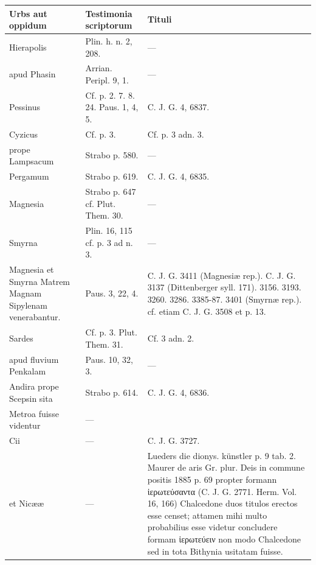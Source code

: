 \documentclass[a4paper, 11pt, oneside, polutonikogreek, german, twocolumn]{article}
\begin{document}
\begin{table}[H]
    \centering
    \begin{tabular}{|p{40mm}|p{45mm}|p{75mm}|}
    \hline
        \textbf{Urbs aut oppidum} & \textbf{Testimonia scriptorum} & \textbf{Tituli} \\ \hline
        Hierapolis & Plin. h. n. 2, 208. & --- \\ \hline
        apud Phasin & Arrian. Peripl. 9, 1. & --- \\ \hline
        Pessinus & Cf. p. 2. 7. 8. 24. Paus. 1, 4, 5. & C. J. G. 4, 6837. \\ \hline
        Cyzicus & Cf. p. 3. & Cf. p. 3 adn. 3. \\ \hline
        prope Lampsacum & Strabo p. 580. & --- \\ \hline
        Pergamum & Strabo p. 619. & C. J. G. 4, 6835. \\ \hline
        Magnesia & Strabo p. 647 cf. Plut. Them. 30. & --- \\ \hline
        Smyrna & Plin. 16, 115 cf. p. 3 ad n. 3. & --- \\ \hline
        Magnesia et Smyrna Matrem Magnam Sipylenam venerabantur. & Paus. 3, 22, 4. & C. J. G. 3411 (Magnesiæ rep.). C. J. G. 3137 (Dittenberger syll. 171). 3156. 3193. 3260. 3286. 3385-87. 3401 (Smyrnæ rep.). cf. etiam C. J. G. 3508 et p. 13. \\ \hline
        Sardes & Cf. p. 3. Plut. Them. 31. & Cf. 3 adn. 2. \\ \hline
        apud fluvium Penkalam & Paus. 10, 32, 3. & --- \\ \hline
        Andira prope Scepsin sita & Strabo p. 614. & C. J. G. 4, 6836. \\ \hline
        Metroa fuisse videntur & --- & ~ \\ \hline
        Cii & --- & C. J. G. 3727. \\ \hline
        et Nicææ & --- & Lueders die dionys. künstler p. 9 tab. 2. Maurer de aris Gr. plur. Deis in commune positis 1885 p. 69 propter formann ἱερωτεύσαντα (C. J. G. 2771. Herm. Vol. 16, 166) Chalcedone duos titulos erectos esse censet; attamen mihi multo probabilius esse videtur concludere formam ἱερωτεύειν non modo Chalcedone sed in tota Bithynia usitatam fuisse. \\ \hline
    \end{tabular}
\end{table}
\clearpage
\end{document}
